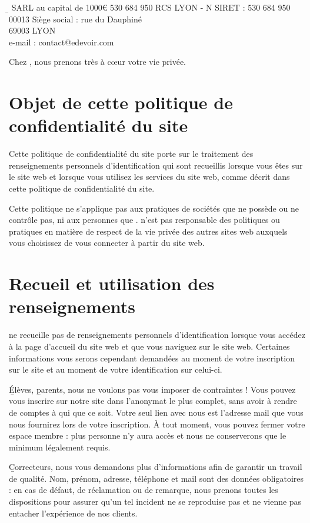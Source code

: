 \b{\eDevoir}
SARL au capital de 1000€
530 684 950 RCS LYON - N SIRET : 530 684 950 00013
Siège social :
 rue du Dauphiné\\
69003 LYON\\
e-mail : contact@edevoir.com

Chez \eDevoir, nous prenons très à cœur votre vie privée.

\section{Objet de cette politique de confidentialité du site}

Cette politique de confidentialité du site porte sur le traitement des renseignements personnels d'identification qui sont recueillis lorsque vous êtes sur le site web et lorsque vous utilisez les services du site web, comme décrit dans cette politique de confidentialité du site.

Cette politique ne s'applique pas aux pratiques de sociétés que \eDevoir ne possède ou ne contrôle pas, ni aux personnes que \eDevoir. \eDevoir n'est pas responsable des politiques ou pratiques en matière de respect de la vie privée des autres sites web auxquels vous choisissez de vous connecter à partir du site web.

\section{Recueil et utilisation des renseignements}

\eDevoir ne recueille pas de renseignements personnels d'identification lorsque vous accédez à la page d'accueil du site web et que vous naviguez sur le site web. Certaines informations vous serons cependant demandées au moment de votre inscription sur le site et au moment de votre identification sur celui-ci.

\b{Élèves}, \b{parents}, nous ne voulons pas vous imposer de contraintes ! Vous pouvez vous inscrire sur notre site dans l'anonymat le plus complet, sans avoir à rendre de comptes à qui que ce soit. Votre seul lien avec nous est l'adresse mail que vous nous fournirez lors de votre inscription. À tout moment, vous pouvez fermer votre espace membre : plus personne n'y aura accès et nous ne conserverons que le minimum légalement requis.

\b{Correcteurs}, nous vous demandons plus d'informations afin de garantir un travail de qualité.  Nom, prénom, adresse, téléphone et mail sont des données obligatoires : en cas de défaut, de réclamation ou de remarque, nous prenons toutes les dispositions pour assurer qu'un tel incident ne se reproduise pas et ne vienne pas entacher l'expérience de nos clients.

